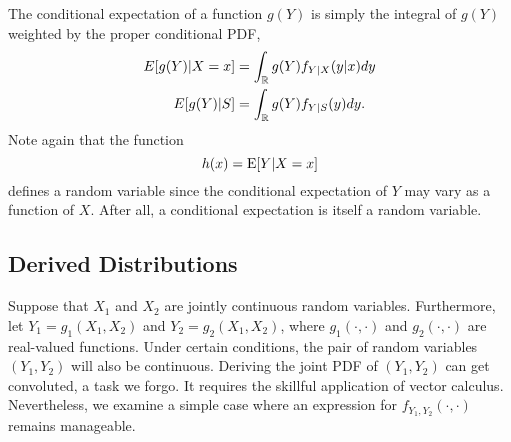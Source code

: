 The conditional expectation of a function $g(Y)$ is simply the integral of $g(Y)$ weighted by the proper conditional PDF,
\begin{align*}
E[g(Y) | X = x] &= \int_{\mathbb{R}} g(Y) f_{Y|X} (y|x) dy \\
E[g(Y) | S] &= \int_{\mathbb{R}} g(Y) f_{Y|S} (y) dy .
\end{align*}
Note again that the function
\begin{equation*}
h(x) = \mathrm{E} [Y | X=x]
\end{equation*}
defines a random variable since the conditional expectation of $Y$ may vary as a function of $X$.
After all, a conditional expectation is itself a random variable.



\subsection{Derived Distributions}

Suppose that $X_1$ and $X_2$ are jointly continuous random variables.
Furthermore, let $Y_1 = g_1 (X_1, X_2)$ and $Y_2 = g_2 (X_1, X_2)$, where $g_1 (\cdot, \cdot)$ and $g_2 (\cdot, \cdot)$ are real-valued functions.
Under certain conditions, the pair of random variables $(Y_1, Y_2)$ will also be continuous.
Deriving the joint PDF of $(Y_1, Y_2)$ can get convoluted, a task we forgo.
It requires the skillful application of vector calculus.
Nevertheless, we examine a simple case where an expression for $f_{Y_1, Y_2} (\cdot, \cdot)$ remains manageable.


